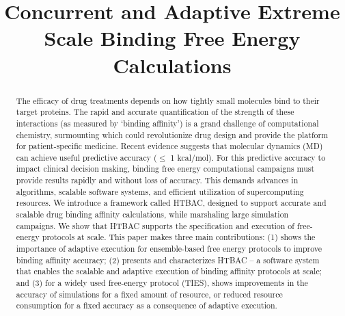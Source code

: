 \documentclass[conference]{IEEEtran}
\begin{document}
\title{Concurrent and Adaptive Extreme Scale Binding Free Energy
Calculations}

\author{
}

\maketitle

\begin{abstract}
The efficacy of drug treatments depends on how tightly small molecules bind to
their target proteins. The rapid and accurate quantification of the strength
of these interactions (as measured by `binding affinity’) is a grand challenge
of computational chemistry, surmounting which could revolutionize drug design
and provide the platform for patient-specific medicine. Recent evidence
suggests that molecular dynamics (MD) can achieve useful predictive accuracy
($\leq$ 1 kcal/mol). For this predictive accuracy to impact clinical decision
making, binding free energy computational campaigns must provide results
rapidly and without loss of accuracy. This demands advances in algorithms,
scalable software systems, and efficient utilization of supercomputing
resources. We introduce a framework called HTBAC, designed to support accurate
and scalable drug binding affinity calculations, while marshaling large
simulation campaigns. We show that HTBAC supports the specification and
execution of free-energy protocols at scale. This paper makes three main
contributions: (1) shows the importance of adaptive execution for 
ensemble-based free energy protocols to improve binding affinity accuracy; (2)
presents and characterizes HTBAC -- a software system that enables the scalable
and adaptive execution of binding affinity protocols at scale; and (3) for a
widely used free-energy protocol (TIES), shows improvements in the accuracy of
simulations for a fixed amount of resource, or reduced resource consumption
for a fixed accuracy as a consequence of adaptive execution.

\end{abstract}
\end{document}
